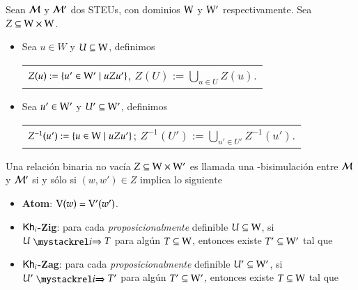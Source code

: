 \begin{definicion}
    Sean $\mathcal{M}$ y $\mathcal{M}'$ dos STEUs, con dominios $\mathrm{W}$ y $\mathrm{W}'$ respectivamente. Sea $Z \subseteq \mathrm{W} \times \mathrm{W}$.
    \begin{itemize}
        \item Sea $u \in W$ y $U \subseteq \mathrm{W}$, definimos
        \begin{nscenter}
            \begin{tabular}{@{}c@{}}
                $Z(u) := \{ u' \in \mathrm{W}' \mid uZu' \}$, \qquad $Z(U) := \bigcup_{u \in U} Z(u)$.
            \end{tabular}
        \end{nscenter}
        \item Sea $u' \in \mathrm{W}'$ y $U' \subseteq \mathrm{W}'$, definimos
        \begin{nscenter}
            \begin{tabular}{@{}c@{}}
                $Z^{-1}(u') := \{ u \in \mathrm{W} \mid uZu' \}$; \qquad $Z^{-1}(U') := \bigcup_{u' \in U'} Z^{-1}(u')$.
            \end{tabular}
        \end{nscenter}
    \end{itemize}

    Una relación binaria no vacía $Z \subseteq \mathrm{W} \times \mathrm{W}'$ es llamada una \KHilogic-bisimulación entre $\mathcal{M}$ y 
    $\mathcal{M}'$ si y sólo si $(w,w') \in Z$ implica lo siguiente
    \begin{itemize}
        \item \textbf{Atom}: $\mathrm{V}(w)=\mathrm{V}'(w')$.

        \item \textbf{$\mathsf{Kh}_i$-Zig}: para cada \emph{proposicionalmente} definible $U \subseteq \mathrm{W}$, si $U \ultsExecAgi T$ para algún $T \subseteq \mathrm{W}$, entonces existe $T' \subseteq \mathrm{W}'$ tal que
        \begin{multicols}{2}
        \end{multicols}
        
        \item \textbf{$\mathsf{Kh}_i$-Zag}: para cada \emph{proposicionalmente} definible $U' \subseteq \mathrm{W}'$, si $U' \ultsExecAgi T'$ para algún $T' \subseteq \mathrm{W}'$, entonces existe $T \subseteq \mathrm{W}$ tal que
        \begin{multicols}{2}
        \end{multicols}


\end{itemize}
\end{definicion}
